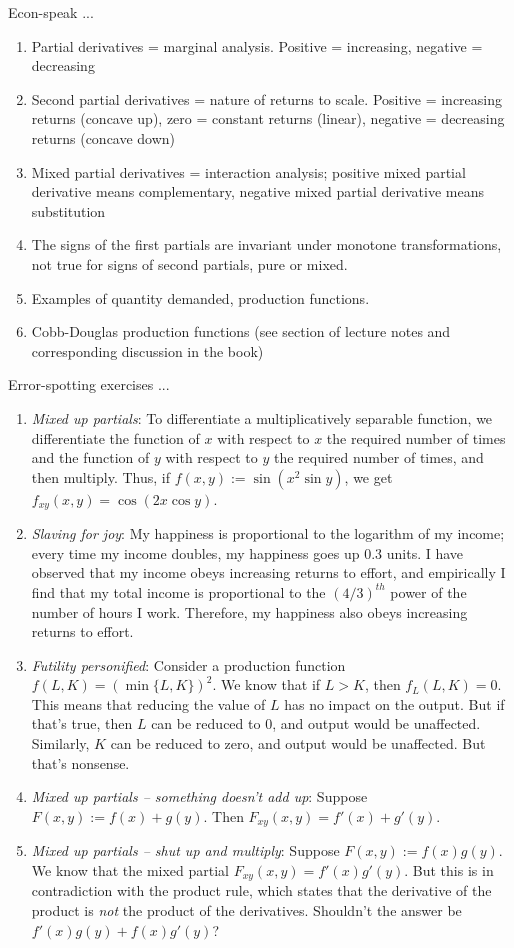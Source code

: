 \documentclass[10pt]{amsart}
\begin{document}
Econ-speak ...

\begin{enumerate}
\item Partial derivatives = marginal analysis. Positive = increasing,
  negative = decreasing
\item Second partial derivatives = nature of returns to
  scale. Positive = increasing returns (concave up), zero = constant
  returns (linear), negative = decreasing returns (concave down)
\item Mixed partial derivatives = interaction analysis; positive mixed
  partial derivative means complementary, negative mixed partial
  derivative means substitution
\item The signs of the first partials are invariant under monotone
  transformations, not true for signs of second partials, pure or
  mixed.
\item Examples of quantity demanded, production functions.
\item Cobb-Douglas production functions (see section of lecture notes
  and corresponding discussion in the book)
\end{enumerate}

Error-spotting exercises ...

\begin{enumerate}
\item {\em Mixed up partials}: To differentiate a multiplicatively
  separable function, we differentiate the function of $x$ with
  respect to $x$ the required number of times and the function of $y$
  with respect to $y$ the required number of times, and then
  multiply. Thus, if $f(x,y) := \sin(x^2\sin y)$, we get $f_{xy}(x,y)
  = \cos(2x\cos y)$.
\item {\em Slaving for joy}: My happiness is proportional to the
  logarithm of my income; every time my income doubles, my happiness
  goes up $0.3$ units. I have observed that my income obeys increasing
  returns to effort, and empirically I find that my total income is
  proportional to the $(4/3)^{th}$ power of the number of hours I
  work. Therefore, my happiness also obeys increasing returns to
  effort.
\item {\em Futility personified}: Consider a production function
  $f(L,K) = (\min \{ L, K \})^2$. We know that if $L > K$, then
  $f_L(L,K) = 0$. This means that reducing the value of $L$ has no
  impact on the output. But if that's true, then $L$ can be reduced to
  $0$, and output would be unaffected. Similarly, $K$ can be reduced
  to zero, and output would be unaffected. But that's nonsense.
\item {\em Mixed up partials -- something doesn't add up}: Suppose
  $F(x,y) := f(x) + g(y)$. Then $F_{xy}(x,y) = f'(x) + g'(y)$.
\item {\em Mixed up partials -- shut up and multiply}: Suppose $F(x,y)
  := f(x)g(y)$. We know that the mixed partial $F_{xy}(x,y) =
  f'(x)g'(y)$. But this is in contradiction with the product rule,
  which states that the derivative of the product is {\em not} the
  product of the derivatives. Shouldn't the answer be $f'(x)g(y) +
  f(x)g'(y)$?
\end{enumerate}
\end{document}
